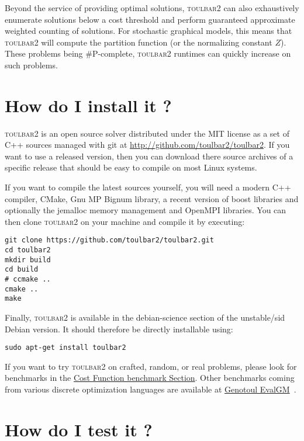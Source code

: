 \documentclass{article}
\def\toulbar2{\textsc{toulbar2}}
\begin{document}
Beyond the service of providing optimal solutions, \toulbar2 can also
exhaustively enumerate solutions below a cost threshold and
perform guaranteed approximate weighted counting of solutions. For
stochastic graphical models, this means that \toulbar2 will compute
the partition function (or the normalizing constant $Z$). These
problems being \#P-complete, \toulbar2 runtimes can quickly increase
on such problems.

\section{How do I install it ?}


\toulbar2 is an open source solver distributed under the MIT license as a set of C++ sources managed with git at
\url{http://github.com/toulbar2/toulbar2}. If you want
to use a released version, then you can download there source archives of a specific release
that should be easy to
compile on most Linux systems.

If you want to compile the latest sources yourself, you will need a modern C++
compiler, CMake, Gnu MP Bignum library, a recent version of boost
libraries and optionally the jemalloc memory management and OpenMPI libraries. You
can then clone \toulbar2 on your machine and compile it by executing:

\begin{verbatim}
git clone https://github.com/toulbar2/toulbar2.git
cd toulbar2
mkdir build
cd build
# ccmake ..
cmake ..
make
\end{verbatim}

Finally, \toulbar2 is available in the debian-science
section of the unstable/sid Debian version. It should therefore be
directly installable using:

\begin{verbatim}
sudo apt-get install toulbar2
\end{verbatim}

If you want to try \toulbar2 on crafted, random, or real problems,
please look for benchmarks in the
\href{http://costfunction.org/en/benchmark}{Cost
  Function benchmark Section}. Other benchmarks coming from various discrete optimization languages are available at \href{http://genoweb.toulouse.inra.fr/~degivry/evalgm}{Genotoul EvalGM}~\cite{Hurley16b}.

\section{How do I test it ?}
\end{document}
